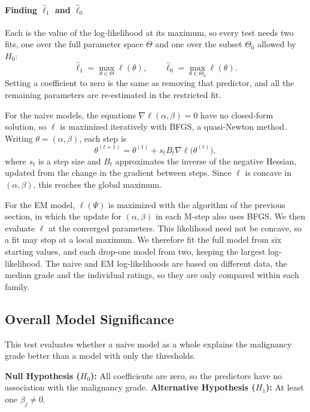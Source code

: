 \documentclass[12pt]{article}
\begin{document}
\paragraph{Finding $\hat{\ell}_1$ and $\hat{\ell}_0$}
Each is the value of the log-likelihood at its maximum, so every test needs
two fits, one over the full parameter space $\Theta$ and one over the
subset $\Theta_0$ allowed by $H_0$:
\[
  \hat{\ell}_1 = \max_{\theta \in \Theta} \ell(\theta),
  \qquad
  \hat{\ell}_0 = \max_{\theta \in \Theta_0} \ell(\theta).
\]
Setting a coefficient to zero is the same as removing that predictor, and
all the remaining parameters are re-estimated in the restricted fit.

For the naive models, the equations $\nabla \ell(\alpha, \beta) = 0$ have
no closed-form solution, so $\ell$ is maximized iteratively with BFGS, a
quasi-Newton method. Writing $\theta = (\alpha, \beta)$, each step is
\[
  \theta^{(t+1)} = \theta^{(t)} + s_t B_t \nabla \ell\bigl(\theta^{(t)}\bigr),
\]
where $s_t$ is a step size and $B_t$ approximates the inverse of the
negative Hessian, updated from the change in the gradient between steps.
Since $\ell$ is concave in $(\alpha, \beta)$, this reaches the global
maximum.

For the EM model, $\ell(\Psi)$ is maximized with the algorithm of the
previous section, in which the update for $(\alpha, \beta)$ in each M-step
also uses BFGS. We then evaluate $\ell$ at the converged parameters. This
likelihood need not be concave, so a fit may stop at a local maximum.
We therefore fit the full model from six starting values, and each drop-one
model from two, keeping the largest log-likelihood. The naive and EM
log-likelihoods are based on
different data, the median grade and the individual ratings, so they are
only compared within each family.

\subsection{Overall Model Significance}

This test evaluates whether a naive model as a whole explains the
malignancy grade better than a model with only the thresholds.

\begin{itemize}
    \ii \textbf{Null Hypothesis ($H_0$):} All coefficients are zero, so
    the predictors have no association with the malignancy grade.
    \ii \textbf{Alternative Hypothesis ($H_1$):} At least one
    $\beta_j \neq 0$.
\end{itemize}
\end{document}
